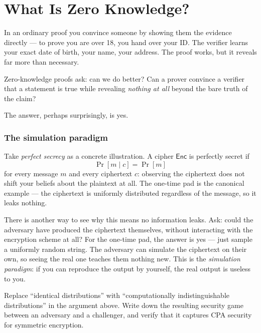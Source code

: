 \section{What Is Zero Knowledge?}

In an ordinary proof you convince someone by showing them the evidence directly --- to prove you are over 18, you hand over your ID. The verifier learns your exact date of birth, your name, your address. The proof works, but it reveals far more than necessary.

Zero-knowledge proofs ask: can we do better? Can a prover convince a verifier that a statement is true while revealing \emph{nothing at all} beyond the bare truth of the claim?

The answer, perhaps surprisingly, is yes.

\subsubsection*{The simulation paradigm}

Take \emph{perfect secrecy} as a concrete illustration. A cipher $\mathsf{Enc}$ is perfectly secret if
\[
  \Pr[m \mid c] = \Pr[m]
\]
for every message $m$ and every ciphertext $c$: observing the ciphertext does not shift your beliefs about the plaintext at all. The one-time pad is the canonical example --- the ciphertext is uniformly distributed regardless of the message, so it leaks nothing.

There is another way to see why this means no information leaks. Ask: could the adversary have produced the ciphertext themselves, without interacting with the encryption scheme at all? For the one-time pad, the answer is yes --- just sample a uniformly random string. The adversary can simulate the ciphertext on their own, so seeing the real one teaches them nothing new. This is the \emph{simulation paradigm}: if you can reproduce the output by yourself, the real output is useless to you.

\begin{exercisebox}
  Replace ``identical distributions'' with ``computationally indistinguishable distributions'' in the argument above. Write down the resulting security game between an adversary and a challenger, and verify that it captures CPA security for symmetric encryption.
\end{exercisebox}

